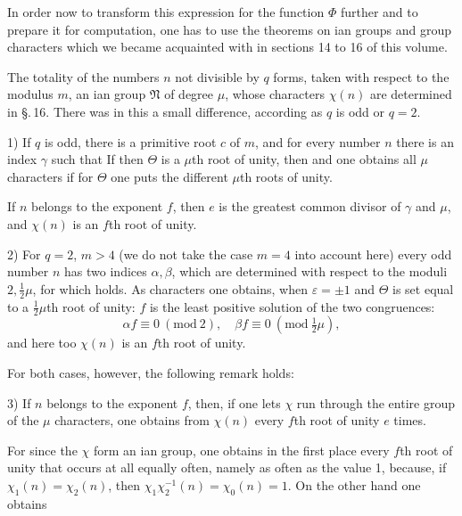 In order now to transform this expression for the function $\varPhi$ further
and to prepare it for computation, one has to use the theorems
on ian groups and group characters
which we became acquainted with in sections 14 to 16 of this
volume.

The totality of the numbers $n$ not divisible by $q$
forms, taken with respect to the modulus $m$, an ian group $\mathfrak{N}$
of degree $\mu$, whose characters $\chi(n)$ are determined in \S.\,16. There
was in this a small difference, according as $q$ is odd or
$q=2$.

1) If $q$ is odd, there is a primitive root $c$ of $m$,
and for every number $n$ there is an index $\gamma$ such that
If then $\Theta$ is a $\mu$th root of unity, then
and one obtains all $\mu$ characters if for $\Theta$
one puts the different $\mu$th roots of unity.

If $n$ belongs to the exponent $f$, then $e$ is the greatest common
divisor of $\gamma$ and $\mu$, and $\chi(n)$ is an $f$th root of unity.

2) For $q=2$, $m>4$ (we do not take the case $m=4$ into account
here) every odd number $n$ has two indices $\alpha, \beta$, which are determined
with respect to the moduli $2, \frac{1}{2}\mu$, for which
holds. As characters one obtains, when $\varepsilon = \pm 1$ and $\Theta$ is set equal
to a $\frac{1}{2}\mu$th root of unity:
$f$ is the least positive solution of the two congruences:
\[
\alpha f \equiv 0\ (\mathrm{mod}\ 2), \quad \beta f \equiv 0\ (\mathrm{mod}\ \tfrac{1}{2}\mu),
\]
and here too $\chi(n)$ is an $f$th root of unity.

For both cases, however, the following remark holds:

3) If $n$ belongs to the exponent $f$, then, if one lets $\chi$
run through the entire group of the $\mu$ characters, one obtains from
$\chi(n)$ every $f$th root of unity $e$ times.

For since the $\chi$ form an ian group, one obtains
in the first place every $f$th root of unity that occurs at all
equally often, namely as often as the value 1, because, if $\chi_1(n)=\chi_2(n)$,
then $\chi_1\chi_2^{-1}(n) = \chi_0(n) = 1$. On the other hand one obtains
